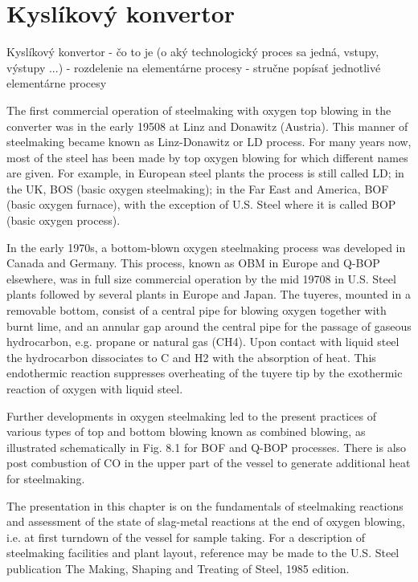 \section{Kyslíkový konvertor}

Kyslíkový konvertor
- čo to je (o aký technologický proces sa jedná, vstupy, výstupy ...)
- rozdelenie na elementárne procesy
- stručne popísať jednotlivé elementárne procesy



The first commercial operation of steelmaking with oxygen top blowing in
the converter was in the early 19508 at Linz and Donawitz (Austria). This
manner of steelmaking became known as Linz-Donawitz or LD process.
For many years now, most of the steel has been made by top oxygen
blowing for which different names are given. For example, in European
steel plants the process is still called LD; in the UK, BOS (basic oxygen
steelmaking); in the Far East and America, BOF (basic oxygen furnace), with
the exception of U.S. Steel where it is called BOP (basic oxygen process).

In the early 1970s, a bottom-blown oxygen steelmaking process was
developed in Canada and Germany. This process, known as OBM in Europe and Q-BOP elsewhere, was in full size commercial operation by the
mid 19708 in U.S. Steel plants followed by several plants in Europe and
Japan. The tuyeres, mounted in a removable bottom, consist of a central
pipe for blowing oxygen together with burnt lime, and an annular gap
around the central pipe for the passage of gaseous hydrocarbon, e.g. propane or natural gas (CH4). Upon contact with liquid steel the hydrocarbon
dissociates to C and H2 with the absorption of heat. This endothermic
reaction suppresses overheating of the tuyere tip by the exothermic reaction of oxygen with liquid steel.

Further developments in oxygen steelmaking led to the present practices of various types of top and bottom blowing known as combined
blowing, as illustrated schematically in Fig. 8.1 for BOF and Q-BOP processes. There is also post combustion of CO in the upper part of the vessel
to generate additional heat for steelmaking.

The presentation in this chapter is on the fundamentals of steelmaking
reactions and assessment of the state of slag-metal reactions at the end of
oxygen blowing, i.e. at first turndown of the vessel for sample taking. For
a description of steelmaking facilities and plant layout, reference may be
made to the U.S. Steel publication The Making, Shaping and Treating of Steel,
1985 edition.


